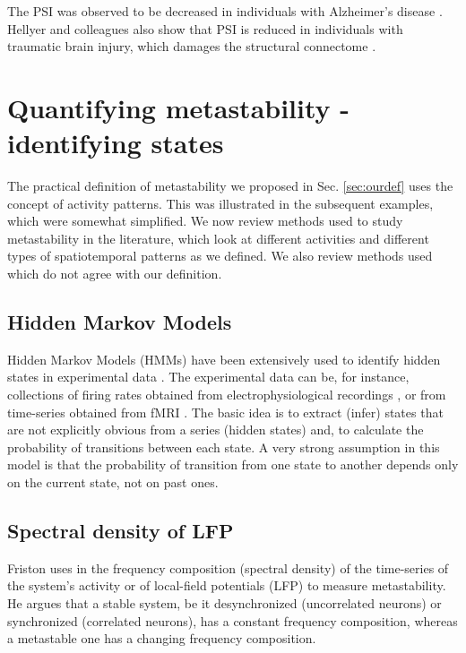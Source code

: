 \documentclass[preprint,superscriptaddress,showpacs,amsmath,amssymb,aps,pre,floatfix]{revtex4-1}
\theoremstyle{definition}
\begin{document}
The PSI was observed to be decreased in individuals with Alzheimer's disease \cite{cordova-palomera_2017}.   
Hellyer and colleagues also show that PSI is reduced in individuals with traumatic brain injury, which damages the structural connectome \cite{hellyer_2015}.


\section{Quantifying metastability - identifying states}
The practical definition of metastability we proposed in Sec. \ref{sec:ourdef} uses the concept of activity patterns. This was illustrated in the subsequent examples, which were somewhat simplified. We now review methods used to study metastability in the literature, which look at different activities and different types of spatiotemporal patterns as we defined. We also review methods used which do not agree with our definition. 



\subsection{Hidden Markov Models}
Hidden Markov Models (HMMs) have been extensively used to identify hidden states in experimental data \cite{lacamera_2019}. The experimental data can be, for instance, collections of firing rates obtained from electrophysiological recordings \cite{mazzucato_2015, lacamera_2019}, or from time-series obtained from fMRI \cite{vidaurre_2017}. The basic idea is to extract (infer) states that are not explicitly obvious from a series (hidden states) and, to calculate the probability of transitions between each state. A very strong assumption in this model is that the probability of transition from one state to another depends only on the current state, not on past ones.

\subsection{Spectral density of LFP}
Friston uses in \cite{friston_1997, friston_2000transients} the frequency composition (spectral density) of the time-series of the system's activity \cite{friston_1997} or of local-field potentials (LFP) \cite{friston_2000transients} to measure metastability. He argues that a stable system, be it desynchronized (uncorrelated neurons) or synchronized (correlated neurons), has a constant frequency composition, whereas a metastable one has a changing frequency composition. 
\end{document}
